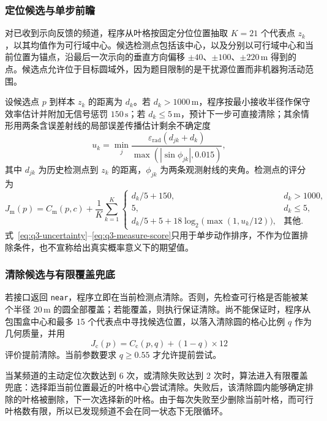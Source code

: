 \subsubsection{定位候选与单步前瞻}

对已收到示向反馈的频道，程序从叶格按固定分位位置抽取 $K=21$ 个代表点 $z_k$，以其均值作为可行域中心。候选检测点包括该中心，以及分别以可行域中心和当前位置为锚点，沿最后一次示向的垂直方向偏移 $\pm40$、$\pm100$、$\pm220\,\mathrm m$ 得到的点。候选点允许位于目标圆域外，因为题目限制的是干扰源位置而非机器狗活动范围。

设候选点 $p$ 到样本 $z_k$ 的距离为 $d_k$。若 $d_k>1000\,\mathrm m$，程序按最小接收半径作保守效率估计并附加无信号惩罚 $150\,\mathrm s$；若 $d_k\leq5\,\mathrm m$，预计下一步可直接清除；其余情形用两条含误差射线的局部误差传播估计剩余不确定度
\begin{equation}
u_k=\min_j\frac{\varepsilon_{\mathrm{rad}}(d_{jk}+d_k)}
{\max(|\sin\phi_{jk}|,0.015)},\label{eq:q3-uncertainty}
\end{equation}
其中 $d_{jk}$ 为历史检测点到 $z_k$ 的距离，$\phi_{jk}$ 为两条观测射线的夹角。检测点的评分为
\begin{equation}
J_{\mathrm m}(p)=C_{\mathrm m}(p,c)+\frac1K\sum_{k=1}^{K}
\begin{cases}
d_k/5+150, & d_k>1000,\\
5, & d_k\leq5,\\
d_k/5+5+18\log_2\!\bigl(\max(1,u_k/12)\bigr), & \text{其他}.
\end{cases}
\label{eq:q3-measure-score}
\end{equation}
式~\eqref{eq:q3-uncertainty}--\eqref{eq:q3-measure-score}只用于单步动作排序，不作为位置排除条件，也不宣称给出真实概率意义下的期望值。

\subsubsection{清除候选与有限覆盖兜底}

若接口返回 \texttt{near}，程序立即在当前检测点清除。否则，先检查可行格是否能被某个半径 $20\,\mathrm m$ 的圆全部覆盖；若能覆盖，则执行保证清除。尚不能保证时，程序从包围盒中心和最多 15 个代表点中寻找候选位置，以落入清除圆的格心比例 $q$ 作为几何质量，并用
\begin{equation}
J_{\mathrm c}(p)=C_{\mathrm c}(p,q)+(1-q)\times12
\label{eq:q3-clear-score}
\end{equation}
评价提前清除。当前参数要求 $q\geq0.55$ 才允许提前尝试。

当某频道的主动定位次数达到 6 次，或清除失败达到 2 次时，算法进入有限覆盖兜底：选择距当前位置最近的叶格中心尝试清除。失败后，该清除圆内能够确定排除的叶格被删除，下一次选择新的叶格。由于每次失败至少删除当前叶格，而可行叶格数有限，所以已发现频道不会在同一状态下无限循环。

